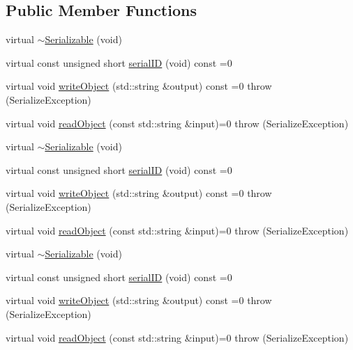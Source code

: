 \subsection*{Public Member Functions}
\begin{DoxyCompactItemize}
\item 
virtual \mbox{\hyperlink{classFILEDB_1_1Serializable_aac7656fa828dd044ad98d50cb7de1084}{$\sim$\+Serializable}} (void)
\item 
virtual const unsigned short \mbox{\hyperlink{classFILEDB_1_1Serializable_a5d639b5dbd5d8ebc7dca1eca31bbc868}{serial\+ID}} (void) const =0
\item 
virtual void \mbox{\hyperlink{classFILEDB_1_1Serializable_a8deaa86e108c08c863881e46cf5578ea}{write\+Object}} (std\+::string \&output) const =0  throw (\+Serialize\+Exception)
\item 
virtual void \mbox{\hyperlink{classFILEDB_1_1Serializable_a21a5831fa4f65790490a8a5eba9fcab2}{read\+Object}} (const std\+::string \&input)=0  throw (\+Serialize\+Exception)
\item 
virtual \mbox{\hyperlink{classFILEDB_1_1Serializable_aac7656fa828dd044ad98d50cb7de1084}{$\sim$\+Serializable}} (void)
\item 
virtual const unsigned short \mbox{\hyperlink{classFILEDB_1_1Serializable_a5d639b5dbd5d8ebc7dca1eca31bbc868}{serial\+ID}} (void) const =0
\item 
virtual void \mbox{\hyperlink{classFILEDB_1_1Serializable_a8deaa86e108c08c863881e46cf5578ea}{write\+Object}} (std\+::string \&output) const =0  throw (\+Serialize\+Exception)
\item 
virtual void \mbox{\hyperlink{classFILEDB_1_1Serializable_a21a5831fa4f65790490a8a5eba9fcab2}{read\+Object}} (const std\+::string \&input)=0  throw (\+Serialize\+Exception)
\item 
virtual \mbox{\hyperlink{classFILEDB_1_1Serializable_aac7656fa828dd044ad98d50cb7de1084}{$\sim$\+Serializable}} (void)
\item 
virtual const unsigned short \mbox{\hyperlink{classFILEDB_1_1Serializable_a5d639b5dbd5d8ebc7dca1eca31bbc868}{serial\+ID}} (void) const =0
\item 
virtual void \mbox{\hyperlink{classFILEDB_1_1Serializable_a8deaa86e108c08c863881e46cf5578ea}{write\+Object}} (std\+::string \&output) const =0  throw (\+Serialize\+Exception)
\item 
virtual void \mbox{\hyperlink{classFILEDB_1_1Serializable_a21a5831fa4f65790490a8a5eba9fcab2}{read\+Object}} (const std\+::string \&input)=0  throw (\+Serialize\+Exception)
\end{DoxyCompactItemize}
